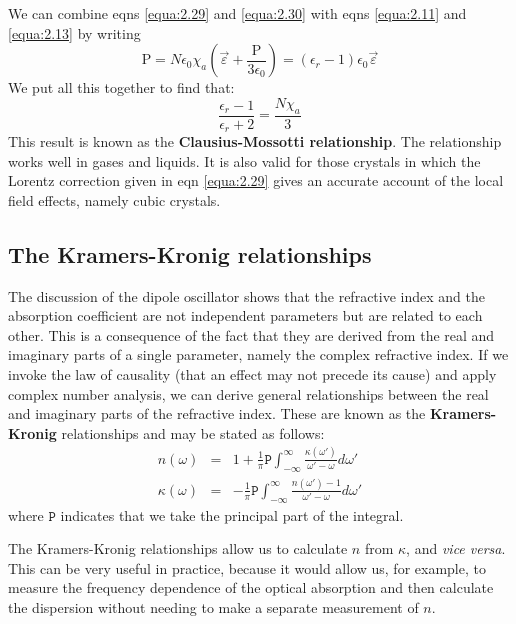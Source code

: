 \documentclass[12pt]{book}
\begin{document}
We can combine eqns \ref{equa:2.29} and \ref{equa:2.30} with eqns \ref{equa:2.11} and \ref{equa:2.13} by writing
\begin{equation}\label{equa:2.34}
  \mathrm{P}=N\epsilon_0\chi_a\left(\vec{\varepsilon}+\frac{\mathrm{P}}{3\epsilon_0}\right)=(\epsilon_r-1)\epsilon_0\vec{\varepsilon}
\end{equation}
We put all this together to find that:
\begin{equation}\label{equa:2.35}
  \frac{\epsilon_r-1}{\epsilon_r+2}=\frac{N\chi_a}{3}
\end{equation}
This result is known as the \textbf{Clausius-Mossotti relationship}. The relationship works well in gases and liquids. It is also valid for those crystals in which the Lorentz correction given in eqn \ref{equa:2.29} gives an accurate account of the local field effects, namely cubic crystals.

\subsection{The Kramers-Kronig relationships}

The discussion of the dipole oscillator shows that the refractive index and the absorption coefficient are not independent parameters but are related to each other. This is a consequence of the fact that they are derived from the real and imaginary parts of a single parameter, namely the complex refractive index. If we invoke the law of causality (that an effect may not precede its cause) and apply complex number analysis, we can derive general relationships between the real and imaginary parts of the refractive index. These are known as the \textbf{Kramers-Kronig} relationships and may be stated as follows:
\begin{eqnarray}
  n(\omega) &=& 1+\frac{1}{\pi}\texttt{P}\int_{-\infty}^{\infty}\frac{\kappa(\omega')}{\omega'-\omega}d\omega' \\
  \kappa(\omega) &=& -\frac{1}{\pi}\texttt{P}\int_{-\infty}^{\infty}\frac{n(\omega')-1}{\omega'-\omega}d\omega'
  \end{eqnarray}
where $\texttt{P}$ indicates that we take the principal part of the integral.

The Kramers-Kronig relationships allow us to calculate $n$ from $\kappa$, and \textit{vice versa}. This can be very useful in practice, because it would allow us, for example, to measure the frequency dependence of the optical absorption and then calculate the dispersion without needing to make a separate measurement of $n$.
\end{document}
